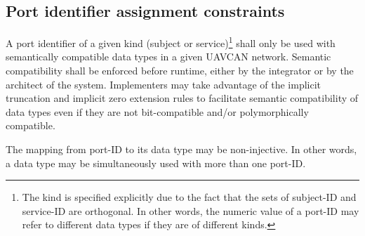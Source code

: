 \subsection{Port identifier assignment constraints}

A port identifier of a given kind (subject or service)\footnote{%
    The kind is specified explicitly due to the fact that the sets of subject-ID and service-ID are orthogonal.
    In other words, the numeric value of a port-ID may refer to different data types if they are of different kinds.
} shall only be used with semantically compatible data types in a given UAVCAN network.
Semantic compatibility shall be enforced before runtime, either by the integrator or by the architect of the system.
Implementers may take advantage of the implicit truncation and implicit zero extension rules to facilitate
semantic compatibility of data types even if they are not bit-compatible and/or polymorphically compatible.

The mapping from port-ID to its data type may be non-injective.
In other words, a data type may be simultaneously used with more than one port-ID.
